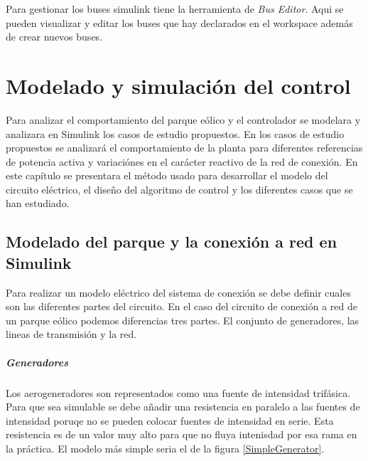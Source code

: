 \documentclass{book}
\begin{document}
Para gestionar los buses simulink tiene la herramienta de \emph{Bus Editor}. Aqui se pueden visualizar y editar los buses que hay declarados en el workspace adem\'as de crear nuevos buses.


\chapter{Modelado y simulaci\'on del control}

Para analizar el comportamiento del parque e\'olico y el controlador se modelara y analizara en Simulink los casos de estudio propuestos. En los casos de estudio propuestos se analizar\'a el comportamiento de la planta para diferentes referencias de potencia activa y variaci\'ones en el car\'acter reactivo de la red de conexi\'on. En este cap\'itulo se presentara el m\'etodo usado para desarrollar el modelo del circuito el\'ectrico, el diseño del algoritmo de control y los diferentes casos que se han estudiado. \par

	\section{Modelado del parque y la conexi\'on a red en Simulink}

Para realizar un modelo el\'ectrico del sistema de conexi\'on se debe definir cuales son las diferentes partes del circuito. En el caso del circuito de conexi\'on a red de un parque e\'olico podemos diferencias tres partes. El conjunto de generadores, las lineas de transmisi\'on y la red. \par 

		\paragraph{Generadores}

Los aerogeneradores son representados como una fuente de intensidad trif\'asica. Para que sea simulable se debe añadir una resistencia en paralelo a las fuentes de intensidad poruqe no se pueden colocar fuentes de intensidad en serie. Esta resistencia es de un valor muy alto para que no fluya intenisdad por esa rama en la pr\'actica. El modelo más simple seria el de la figura \ref{SimpleGenerator}. \par
\end{document}
